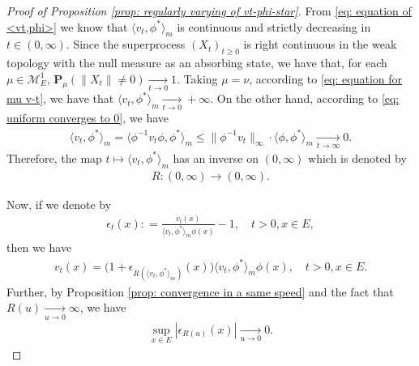 \documentclass[12pt,a4paper]{amsart}
\theoremstyle{definition}
\numberwithin{equation}{section}
\begin{document}
\begin{proof}
  [Proof of Proposition \ref{prop: regularly varying of vt-phi-star}]
	From \eqref{eq: equation of <vt,phi>} we know that $\langle v_t,\phi^* \rangle_m$ is continuous and strictly decreasing in $t \in (0,\infty)$.
	Since the superprocess $(X_t)_{t\geq 0}$ is right continuous in the weak topology with the null measure as an absorbing state, we have that, for each $\mu \in \mathcal M_E^1$, $\mathbf P_\mu (\|X_t\| \neq 0) \xrightarrow[t\to 0]{} 1$.
	Taking $\mu = \nu$, according to \eqref{eq: equation for mu v-t}, we have that $\langle v_{t}, \phi^*\rangle_m \xrightarrow[t\to 0]{} +\infty$.
	On the other hand, according to \eqref{eq: uniform converges to 0}, we have 
\begin{align}
  \langle v_{t}, \phi^*\rangle_m
  = \langle \phi^{-1} v_t \phi, \phi^*\rangle_m
  \leq \|\phi^{-1} v_t\|_\infty \cdot \langle \phi, \phi^* \rangle_m
 \xrightarrow[t\to \infty]{} 0.
\end{align}
	Therefore, the map $t\mapsto \langle v_t,\phi^*  \rangle_m$ has an inverse on $(0,\infty)$ which is denoted by
\begin{align}
	R: (0,\infty) \to (0,\infty).
\end{align}
	
Now, if we denote by
\begin{align}
	\epsilon_{t}(x)
	: = \frac{v_t(x)}{\langle v_t, \phi^*\rangle_m \phi(x)} - 1,
	\quad t>0, x\in E,
\end{align}
then we have
\begin{align}\label{eq: change variable using inverse}
	v_t(x)
	= \big(1+ \epsilon_{R(\langle v_t,\phi^* \rangle_m)}(x) \big )\langle v_t,\phi^* \rangle_m \phi(x),
	\quad t>0, x\in E.
\end{align}
Further, by Proposition \ref{prop: convergence in a same speed} and the fact that $R(u)\xrightarrow[u\to 0]{} \infty$, we have
  \begin{align}\label{eq: epsilon R converges to 0}
    \sup_{x\in E}|\epsilon_{R(u)}(x)|
    \xrightarrow[u\to 0]{} 0.
  \end{align}


\end{proof}
\end{document}
